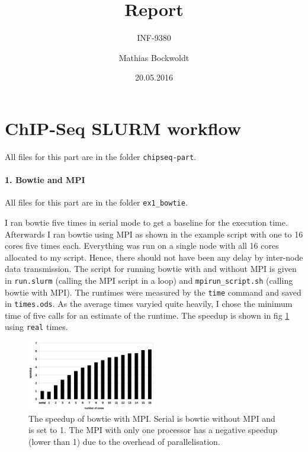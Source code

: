 \documentclass[paper=a4, 12pt]{scrartcl}
\begin{document}
\title{Report}
\subtitle{INF-9380}
\author{Mathias Bockwoldt}
\date{20.05.2016}

\maketitle

\onehalfspacing

\section{ChIP-Seq SLURM workflow}

All files for this part are in the folder \texttt{chipseq-part}.

\paragraph{1. Bowtie and MPI} All files for this part are in the folder \texttt{ex1\_bowtie}.

I ran bowtie five times in serial mode to get a baseline for the execution time. Afterwards I ran bowtie using MPI as shown in the example script with one to 16 cores five times each. Everything was run on a single node with all 16 cores allocated to my script. Hence, there should not have been any delay by inter-node data transmission. The script for running bowtie with and without MPI is given in \texttt{run.slurm} (calling the MPI script in a loop) and \texttt{mpirun\_script.sh} (calling bowtie with MPI). The runtimes were measured by the \texttt{time} command and saved in \texttt{times.ods}. As the average times varyied quite heavily, I chose the minimum time of five calls for an estimate of the runtime. The speedup is shown in fig \ref{fig:chipseq-bowtie} using \texttt{real} times.

\begin{figure}[ht]
  \centering
    \includegraphics[width=0.5\textwidth]{chipseq-bowtie}
  \caption{The speedup of bowtie with MPI. Serial is bowtie without MPI and is set to 1. The MPI with only one processor has a negative speedup (lower than 1) due to the overhead of parallelisation.}
  \label{fig:chipseq-bowtie}
\end{figure}
\end{document}
